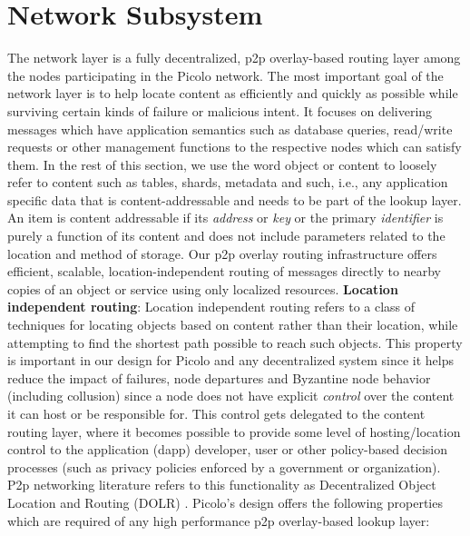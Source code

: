 \section{Network Subsystem} 
\label{net}
The network layer is a fully decentralized, p2p overlay-based routing layer among the nodes participating in the \textsf{\textsf{Picolo}} network. The most important goal of the network layer is to help locate content as efficiently and quickly as possible while surviving certain kinds of failure or malicious intent. It focuses on delivering messages which have application semantics such as database queries, read/write requests or other management functions to the respective nodes which can satisfy them. In the rest of this section, we use the word object or content to loosely refer to content such as tables, shards, metadata and such, i.e., any
application specific data that is content-addressable and needs to be part of the lookup layer. An item is content addressable if its {\em address} or {\em key} or the primary {\em identifier} is purely a function of its content and does not include parameters related to the location and method of storage. Our p2p overlay routing infrastructure offers efficient, scalable, location-independent routing of messages directly to nearby copies of an object or service using only localized resources.
\newline\newline
\textbf{Location independent routing}: Location independent routing refers to a class of techniques for locating objects
based on content rather than their location, while attempting to find the shortest path possible to reach such objects.
This property is important in our design for \textsf{Picolo} and any decentralized system since it helps reduce the impact of
failures, node departures and Byzantine node behavior (including collusion) since a node does not have explicit {\em
control} over the content it can host or be responsible for. This control gets delegated to the content routing layer,
where it becomes possible to provide some level of hosting/location control to the application
(dapp) developer, user or other policy-based decision processes (such as privacy policies enforced by a government or
organization).  P2p networking literature refers to this functionality as Decentralized Object Location and
Routing (DOLR) \cite{dolr2003}. \textsf{Picolo}'s design offers the following properties which are required of any high performance p2p overlay-based lookup layer:

